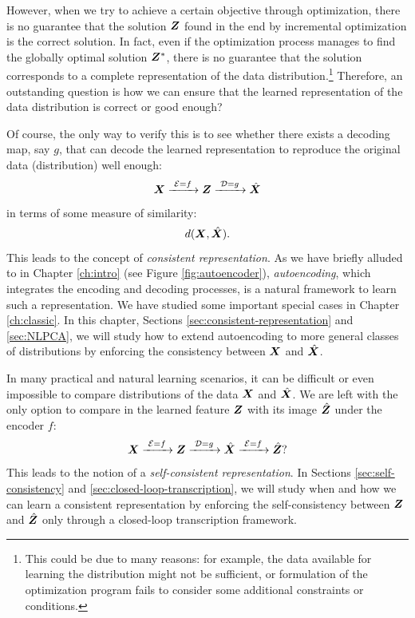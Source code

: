 \documentclass[../../book-main.tex]{subfiles}
\begin{document}
However, when we try to achieve a certain objective through
optimization, there is no guarantee that the solution $\bm{Z}$ found in
the end by incremental optimization is the correct solution. In fact, even if
the optimization process manages to find the globally optimal
solution $\bm{Z}^*$, there is no guarantee that the solution corresponds
to a complete representation of the data distribution.\footnote{This could be due to many reasons: for example, the data available for learning the distribution might not be sufficient, or formulation of the optimization program fails to consider some additional constraints or conditions.} Therefore, an outstanding question is how we can ensure that the learned representation of the data distribution is
correct or good enough? 

Of course, the only way to verify this is to see whether there exists a decoding map, say $g$, that can decode the learned representation to reproduce the original data (distribution) well enough:
\begin{equation}
  \bm{X}
  \xrightarrow{\hspace{1mm} \mathcal{E} = f \hspace{1mm}} \bm{Z}
  \xrightarrow{\hspace{1mm} \mathcal{D} = g \hspace{1mm}} \hat{\bm{X}}
\end{equation}
in terms of some measure of similarity:
\begin{equation}
  d(\bm{X}, \hat {\bm{X}}).
\end{equation}
This leads to the concept of {\em consistent representation}. As we have briefly alluded to in
Chapter \ref{ch:intro} (see Figure \ref{fig:autoencoder}), {\em autoencoding}, which integrates the
encoding and decoding processes, is a natural framework to learn such a representation. We have studied some important special cases in Chapter \ref{ch:classic}. In
this chapter, Sections \ref{sec:consistent-representation} and \ref{sec:NLPCA}, we will study how to extend autoencoding to
more general classes of distributions by enforcing the consistency between $\bm{X}$ and $\hat {\bm{X}}$.

In many practical and natural learning scenarios, it can be difficult or even impossible to compare distributions of the data $\bm{X}$ and $\hat {\bm{X}}$. We are left with the only option to compare in the learned feature $\bm{Z}$ with its image $\hat {\bm{Z}}$ under the encoder $f$: 
\begin{equation}
 \bm{X}
\xrightarrow{\hspace{1mm} \mathcal{E} = f \hspace{1mm}} \bm{Z}  \xrightarrow{\hspace{1mm} \mathcal{D} = g \hspace{1mm}} \hat{\bm{X}} \xrightarrow{\hspace{1mm} \mathcal{E} = f \hspace{1mm}} \hat {\bm{Z}}?
\end{equation}
This leads to the notion of a {\em self-consistent representation}. In Sections \ref{sec:self-consistency} and \ref{sec:closed-loop-transcription}, we will study when and how we can learn a consistent representation by enforcing the self-consistency between $\bm{Z}$ and $\hat {\bm{Z}}$ only through a closed-loop transcription framework. 
\end{document}
